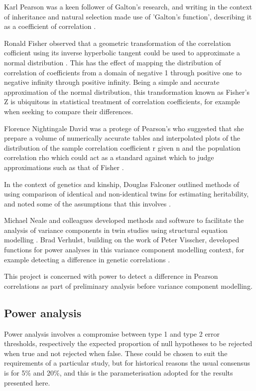 Karl Pearson was a keen follower of Galton's research, and writing in the context of inheritance and natural selection made use of 'Galton's function', describing it as a coefficient of correlation \cite{Pearson1895}.  

Ronald Fisher observed that a geometric transformation of the correlation cofficient using its inverse hyperbolic tangent could be used to approximate a normal distribution \cite{Fisher1915}.  This has the effect of mapping the distribution of correlation of coefficients from a domain of negative 1 through positive one to negative infinity through positive infinity. Being a simple and accurate approximation of the normal distribution, this transformation known as Fisher's Z is ubiquitous in statistical treatment of correlation coefficients, for example when seeking to compare their differences.

Florence Nightingale David was a protege of Pearson's who suggested that she prepare a volume of numerically accurate tables and interpolated plots of the distribution of the sample correlation coefficient r given n and the population correlation rho which could act as a standard against which to judge approximations such as that of Fisher \cite{David1938}. 

In the context of genetics and kinship, Douglas Falconer outlined methods of using comparison of identical and non-identical twins for estimating heritability, and noted some of the assumptions that this involves \cite{Falconer1960}.

Michael Neale and colleagues developed methods and software to facilitate the analysis of variance components in twin studies using structural equation modelling \cite{Neale1992}.  Brad Verhulst, building on the work of Peter Visscher, developed functions for power analyses in this variance component modelling context, for example detecting a difference in genetic correlations \cite{Visscher2004,Visscher2008a}.

This project is concerned with power to detect a difference in Pearson correlations as part of preliminary analysis before variance component modelling.

\subsection{Power analysis}
Power analysis involves a compromise between type 1 and type 2 error thresholds, respectively the expected proportion of null hypotheses to be rejected when true and not rejected when false.  These could be chosen to suit the requirements of a particular study, but for historical reasons the usual consensus is for 5\% and 20\%, and this is the parameterisation adopted for the results presented here.

